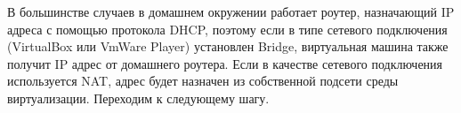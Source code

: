 \documentclass[14pt, a4paper]{article}
\begin{document}
\begin{figure}[h]%
    \centering
    \label{1.3} %
\end{figure}

\begin{figure}[h]%
    \centering
    \label{1.4} %
\end{figure}

В большинстве случаев в домашнем окружении работает роутер, назначающий IP адреса с
помощью протокола DHCP, поэтому если в типе сетевого подключения (VirtualBox или VmWare Player)
установлен Bridge, виртуальная машина также получит IP адрес от домашнего роутера. Если в
качестве сетевого подключения используется NAT, адрес будет назначен из собственной подсети
среды виртуализации. Переходим к следующему шагу.
\end{document}
